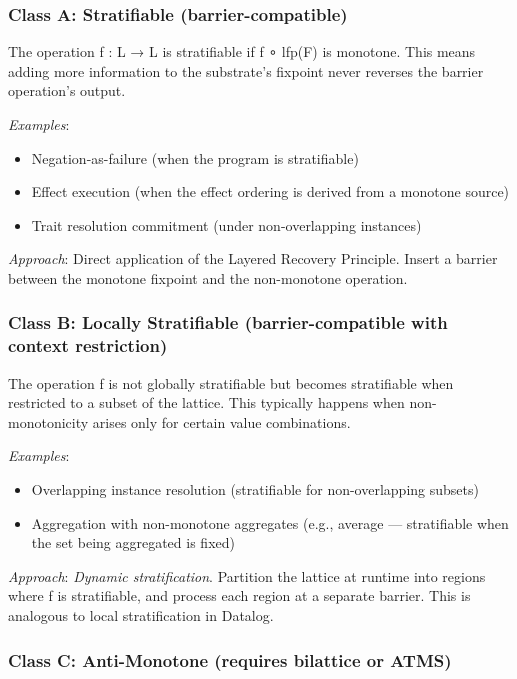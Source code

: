 \documentclass[11pt]{article}
\begin{document}
\subsubsection{Class A: Stratifiable (barrier-compatible)}
\label{sec:orgb870b70}

The operation f : L → L is stratifiable if f ∘ lfp(F) is monotone. This means
adding more information to the substrate's fixpoint never reverses the barrier
operation's output.

\emph{Examples}:
\begin{itemize}
\item Negation-as-failure (when the program is stratifiable)
\item Effect execution (when the effect ordering is derived from a monotone source)
\item Trait resolution commitment (under non-overlapping instances)
\end{itemize}

\emph{Approach}: Direct application of the Layered Recovery Principle. Insert a
barrier between the monotone fixpoint and the non-monotone operation.
\subsubsection{Class B: Locally Stratifiable (barrier-compatible with context restriction)}
\label{sec:org3ad20d0}

The operation f is not globally stratifiable but becomes stratifiable when
restricted to a subset of the lattice. This typically happens when non-monotonicity
arises only for certain value combinations.

\emph{Examples}:
\begin{itemize}
\item Overlapping instance resolution (stratifiable for non-overlapping subsets)
\item Aggregation with non-monotone aggregates (e.g., average — stratifiable when
the set being aggregated is fixed)
\end{itemize}

\emph{Approach}: \emph{Dynamic stratification}. Partition the lattice at runtime into
regions where f is stratifiable, and process each region at a separate barrier.
This is analogous to local stratification in Datalog.
\subsubsection{Class C: Anti-Monotone (requires bilattice or ATMS)}
\label{sec:org7e951e1}
\end{document}
